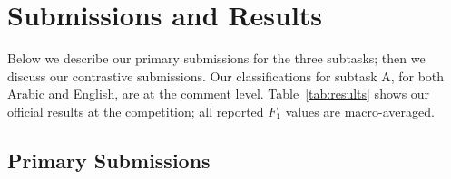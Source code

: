 \section{Submissions and Results}
\label{sec:experiments}

Below we describe our primary submissions for the three subtasks;
then we discuss our contrastive submissions.
Our classifications for subtask A, for both Arabic and English, are at the comment level.
Table~\ref{tab:results} shows our official results at the competition;
all reported $F_1$ values are macro-averaged.

\subsection{Primary Submissions}


%
%

